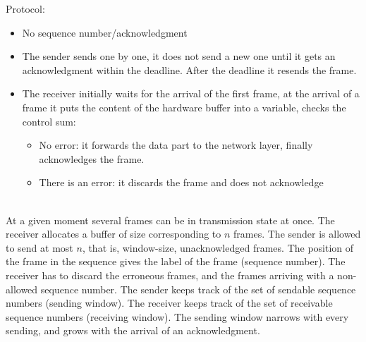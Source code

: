 \documentclass[margin=0px]{article}
\begin{document}
\begin{description}
\begin{description}
\begin{itemize}
                          Protocol:
                          \begin{itemize}
                              \item No sequence number/acknowledgment
                              \item The sender sends one by one, it does not send a new one until it gets an acknowledgment within the deadline. After the deadline it resends the frame.
                              \item The receiver initially waits for the arrival of the first frame, at the arrival of a frame it puts the content of the hardware buffer into a variable, checks the control sum:
                                    \begin{itemize}
                                        \item No error: it forwards the data part to the network layer, finally acknowledges the frame.
                                        \item There is an error: it discards the frame and does not acknowledge
                                    \end{itemize}
                          \end{itemize}
                \end{itemize}
            \item[Sliding window protocol] \hfill \\
                At a given moment several frames can be in transmission state at once. The receiver allocates a buffer of size corresponding to $n$ frames. The sender is allowed to send at most $n$, that is, window-size, unacknowledged frames. The position of the frame in the sequence gives the label of the frame (sequence number).
                The receiver has to discard the erroneous frames, and the frames arriving with a non-allowed sequence number. The sender keeps track of the set of sendable sequence numbers (sending window). The receiver keeps track of the set of receivable sequence numbers (receiving window). The sending window narrows with every sending, and grows with the arrival of an acknowledgment.


\end{description}
\end{description}
\end{document}
